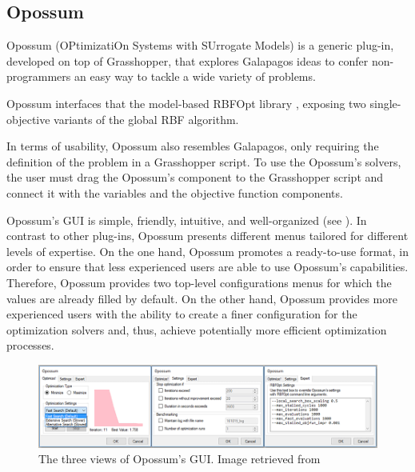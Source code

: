 \subsection{Opossum}
Opossum (OPtimizatiOn Systems with SUrrogate Models) \cite{Wortmann2017Opossum} is a generic plug-in, developed on top of Grasshopper, that explores Galapagos ideas to confer non-programmers an easy way to tackle a wide variety of problems.

Opossum interfaces that the model-based RBFOpt library \cite{RBFOPT}, exposing two single-objective variants of the global \ac{RBF} algorithm. 

In terms of usability, Opossum also resembles Galapagos, only requiring the definition of the problem in a Grasshopper script. To use the Opossum's solvers, the user must drag the Opossum's component to the Grasshopper script and connect it with the variables and the objective function components.

Opossum's \ac{GUI} is simple, friendly, intuitive, and well-organized (see ). In contrast to other plug-ins, Opossum presents different menus tailored for different levels of expertise. On the one hand, Opossum promotes a ready-to-use format, in order to ensure that less experienced users are able to use Opossum's capabilities. Therefore, Opossum provides two top-level configurations menus for which the values are already filled by default. On the other hand, Opossum provides more experienced users with the ability to create a finer configuration for the optimization solvers and, thus, achieve potentially more efficient optimization processes. 

\begin{figure}
	\centering
	\includegraphics[width=1\textwidth]{Images/Background/Opossum/opossum_1.png}
	\caption[Opossum GUI]{The three views of Opossum's \ac{GUI}. Image retrieved from~\cite{Wortmann2017Opossum}}
	\label{fig:opossum}
\end{figure}


